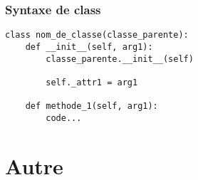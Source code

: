 \begin{frame}[fragile]
  \frametitle{Syntaxe de class}
  \begin{lstlisting}
class nom_de_classe(classe_parente):
    def __init__(self, arg1):
        classe_parente.__init__(self)

        self._attr1 = arg1

    def methode_1(self, arg1):
        code...
  \end{lstlisting}
\end{frame}

\section{Autre}
